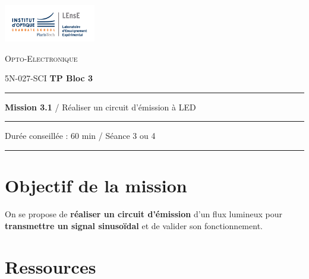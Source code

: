 \newpage
\pagestyle{empty}

\begin{minipage}[c]{.25\linewidth}
	\includegraphics[width=4cm]{images/Logo-LEnsE.png}
\end{minipage} \hfill
\begin{minipage}[c]{.4\linewidth}

\begin{center}
\vspace{0.3cm}
{\Large \textsc{Opto-Electronique}}

\medskip

5N-027-SCI \qquad \textbf{\Large TP Bloc 3}

\end{center}
\end{minipage}\hfill

\vspace{0.5cm}

\noindent \rule{\linewidth}{1pt}

{\noindent\Large \textbf{Mission 3.1} / Réaliser un circuit d'émission à LED} 

\vspace{-0.5cm}

\begin{center}
\noindent \rule{\linewidth}{1pt}

Durée conseillée : 60 min / Séance 3 ou 4

\vspace{-0.2cm}
\noindent \rule{\linewidth}{1pt}
\end{center}

\section{Objectif de la mission}
\label{mission31}

On se propose de \textbf{réaliser un circuit d'émission} d'un flux lumineux pour \textbf{transmettre un signal sinusoïdal} et de valider son fonctionnement.

\section{Ressources}

